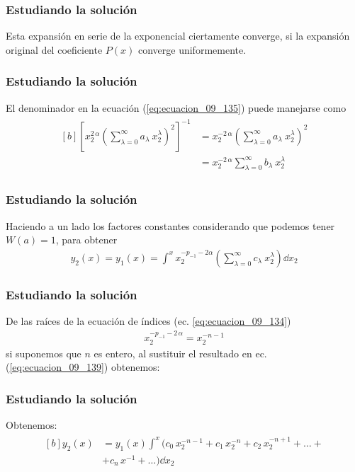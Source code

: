 \begin{frame}
\frametitle{Estudiando la solución}
Esta expansión en serie de la exponencial ciertamente converge, si la expansión original del coeficiente $P(x)$ converge uniformemente.
\end{frame}
\begin{frame}
\frametitle{Estudiando la solución}
El denominador en la ecuación (\ref{eq:ecuacion_09_135}) puede manejarse como
\begin{align}
\begin{aligned}[b]
\left[ x_{2}^{2 \, \alpha} \left( \sum_{\lambda=0}^{\infty} a_{\lambda} \: x_{2}^{\lambda} \right)^{2} \right]^{-1} &= x_{2}^{-2 \, \alpha} \left( \sum_{\lambda=0}^{\infty} a_{\lambda} \: x_{2}^{\lambda} \right)^{2}  \\
&= x_{2}^{-2 \, \alpha} \sum_{\lambda=0}^{\infty} b_{\lambda} \: x_{2}^{\lambda}
\end{aligned}
\label{eq:ecuacion_09_138}
\end{align}
\end{frame}
\begin{frame}
\frametitle{Estudiando la solución}
Haciendo a un lado los factores constantes considerando que podemos tener $W(a) = 1$, para obtener
\begin{align}
y_{2}(x) =  y_{1}(x) = \int^{x} x_{2}^{-p_{-1}-2 \alpha} \left( \sum_{\lambda=0}^{\infty} c_{\lambda} \: x_{2}^{\lambda} \right) \dd{x_{2}} 
\label{eq:ecuacion_09_139}
\end{align}
\end{frame}
\begin{frame}
\frametitle{Estudiando la solución}
De las raíces de la ecuación de índices (ec. \ref{eq:ecuacion_09_134})
\begin{align}
x_{2}^{-p_{-1} - 2 \, \alpha} = x_{2}^{-n-1}
\end{align}
si suponemos que $n$ es entero, al sustituir el resultado en ec. (\ref{eq:ecuacion_09_139}) obtenemos:
\end{frame}
\begin{frame}
\frametitle{Estudiando la solución}
Obtenemos:
\fontsize{12}{12}\selectfont
\begin{align}
\begin{aligned}[b]
y_{2}(x) &= y_{1}(x) \int^{x} (c_{0} \, x_{2}^{-n-1} + c_{1} \, x_{2}^{-n} + c_{2} \, x_{2}^{-n+1} + \ldots + \\
&+ c_{n} \, x^{-1} + \ldots ) \dd{x_{2}}
\end{aligned}
\label{eq:ecuacion_09_141}
\end{align}
\end{frame}
